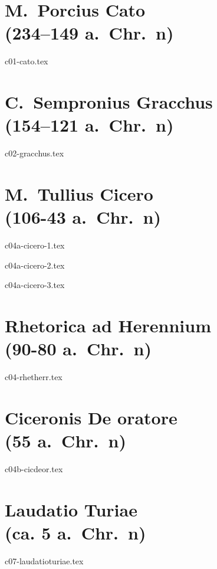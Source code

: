 \documentclass[a4paper,12pt,twoside]{report}
\begin{document}


\chapter[Cato]{M.\ Porcius Cato \\(234–149 a.~Chr.~n)}

{c01-cato.tex}

\chapter[C.\ Gracchus]{C.\ Sempronius Gracchus \\(154–121 a.~Chr.~n)}

{c02-gracchus.tex}

\chapter[Cicero]{M.\ Tullius Cicero \\(106-43 a.~Chr.~n)}

{c04a-cicero-1.tex}

{c04a-cicero-2.tex}

{c04a-cicero-3.tex}

\chapter[Rhetorica ad Herennium]{Rhetorica ad Herennium \\(90-80 a.~Chr.~n)}

{c04-rhetherr.tex}

\chapter[Ciceronis De oratore]{Ciceronis De oratore \\(55 a.~Chr.~n)}

{c04b-cicdeor.tex}

\chapter[Laudatio Turiae]{Laudatio Turiae \\(ca. 5 a.\ Chr.\ n)}

{c07-laudatioturiae.tex}


\end{document}
